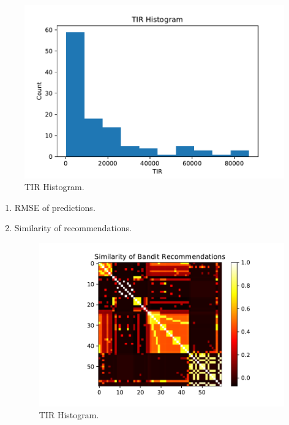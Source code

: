 \documentclass{article}
\begin{document}
\begin{figure}[t]
    \centering
    \includegraphics[scale=0.7]{plots/TIR_histogram.pdf}
    \caption{TIR Histogram.}
    \label{fig: TIR Histogram.}
\end{figure}

\begin{enumerate}
    \item RMSE of predictions.
    
    \item Similarity of recommendations. 
    \begin{figure}[t]
    \centering
    \includegraphics[scale=0.7]{plots/similarity_first_round_recommendation.pdf}
    \caption{TIR Histogram.}
    \label{fig: TIR Histogram.}
\end{figure}
\end{enumerate}{}
\end{document}

